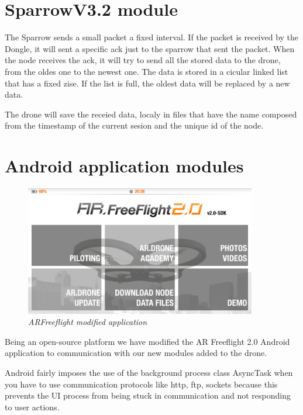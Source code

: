 \section{SparrowV3.2 module}

The Sparrow sends a small packet a fixed interval. If the packet is received by the Dongle, it will sent a specific ack just to the sparrow that sent the packet. When the node receives the ack, it will try to send all the stored data to the drone, from the oldes one to the newest one. The data is stored in a cicular linked list that has a fixed zise. If the list is full, the oldest data will be replaced by a new data.

The drone will save the receied data, localy in files that have the name composed from the timestamp of the current sesion and the unique id of the node.


\section{Android application modules}

\begin{figure}[ht]
\begin{center}
\includegraphics[width=0.9\textwidth]{img/android_app.png}
\end{center}
\caption{\small \itshape{ARFreeflight modified application}}
\end{figure}

Being an open-source platform we have modified the AR Freeflight 2.0 Android application to communication with our new modules added to the drone.
 
Android fairly imposes the use of the background process class AsyncTask when you have to use communication protocols like http, ftp, sockets because this prevents the UI process from being stuck in communication and not responding to user actions.

